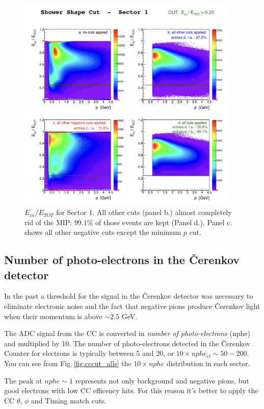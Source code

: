 \begin{figure}[ht]
  \centering
		\includegraphics[width=0.95\textwidth]{img/cut-11EoOEtot_sector-1.png}
		\caption{$E_{in}/E_{TOT}$ for Sector 1. All other cuts (panel b.)
					almost completely rid of the MIP: $99.1\%$ of those events are kept (Panel d.). 
					Panel c. shows all other negative cuts except the minimum $p$ cut.}
 		\label{fig:einetot}
\end{figure}


\clearpage\newpage
\subsection{Number of photo-electrons in the \v Cerenkov detector}
\label{sec:cc_cut}
In the past a threshold for the signal in the \v Cerenkov detector was necessary to eliminate
electronic noise and the fact that negative pions produce \v Cerenkov light when 
their momentum is above $\sim 2.5$ GeV.

The ADC signal from the CC is converted in 
{\it number of photo-electrons} (nphe) and
multiplied by 10. The number of photo-electrons detected in the \v Cerenkov
Counter for electrons is typically between 5 and 20, or $10\times nphe_{el} \sim 50-200$.
You can see from Fig.\,\ref{fig:cccut_alls} the $10\times nphe$
distribution in each sector.

The peak at $nphe \sim 1$ represents not only background and
negative pions, but good electrons with low CC efficency hits. For this reason
it's better to apply the CC $\theta$, $\phi$ and Timing match cuts.


